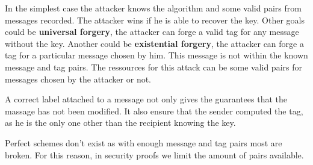In the simplest case the attacker knows the algorithm and some valid pairs from messages recorded.
The attacker wins if he is able to recover the key.
Other goals could be \textbf{universal forgery}, the attacker can forge a valid tag for any message without the key.
Another could be \textbf{existential forgery}, the attacker can forge a tag for a particular message chosen by him.
This message is not within the known message and tag pairs.
The ressources for this attack can be some valid pairs for messages chosen by the attacker or not.

A correct label attached to a message not only gives the guarantees that the massage has not been modified.
It also ensure that the sender computed the tag, as he is the only one other than the recipient knowing the key.

Perfect schemes don't exist as with enough message and tag pairs most are broken.
For this reason, in security proofs we limit the amount of pairs available.
